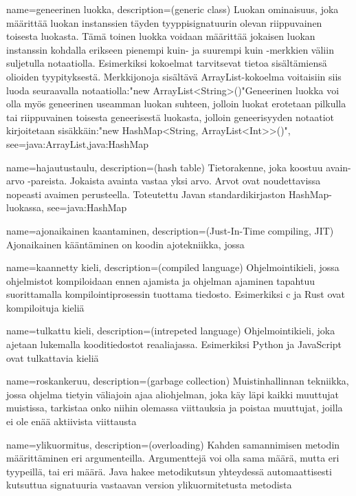 {
	name=geneerinen luokka,
	description={(generic class) Luokan ominaisuus, joka määrittää luokan instanssien täyden
tyyppisignatuurin olevan riippuvainen toisesta luokasta. Tämä toinen luokka voidaan määrittää
jokaisen luokan instanssin kohdalla erikseen pienempi kuin- ja suurempi kuin -merkkien väliin
suljetulla notaatiolla. Esimerkiksi kokoelmat tarvitsevat tietoa sisältämiensä olioiden
tyypityksestä. Merkkijonoja sisältävä ArrayList-kokoelma voitaisiin siis luoda seuraavalla 
notaatiolla:\newline{}"new ArrayList<String>()"\newline{}Geneerinen luokka voi olla myös geneerinen useamman luokan suhteen, jolloin luokat erotetaan pilkulla tai riippuvainen toisesta
geneerisestä luokasta, jolloin geneerisyyden notaatiot kirjoitetaan
sisäkkäin:\newline{}"new HashMap<String, ArrayList<Int>>()"},
	see={java:ArrayList,java:HashMap}
}

{
	name=hajautustaulu,
	description={(hash table) Tietorakenne, joka koostuu avain-arvo -pareista. Jokaista avainta
vastaa yksi arvo. Arvot ovat noudettavissa nopeasti avaimen perusteella. Toteutettu Javan
standardikirjaston HashMap-luokassa},
	see={java:HashMap}
}

{
	name=ajonaikainen kaantaminen,
	description={(Just-In-Time compiling, JIT) Ajonaikainen kääntäminen on koodin ajotekniikka,
jossa}
}


{
	name=kaannetty kieli,
	description={(compiled language) Ohjelmointikieli, jossa ohjelmistot kompiloidaan ennen
ajamista ja ohjelman ajaminen tapahtuu suorittamalla kompilointiprosessin tuottama tiedosto.
Esimerkiksi c ja Rust ovat kompiloituja kieliä}
}


{
	name=tulkattu kieli,
	description={(intrepeted language) Ohjelmointikieli, joka ajetaan lukemalla kooditiedostot
reaaliajassa. Esimerkiksi Python ja JavaScript ovat tulkattavia kieliä}
}

{
	name=roskankeruu,
	description={(garbage collection) Muistinhallinnan tekniikka, jossa ohjelma tietyin väliajoin
ajaa aliohjelman, joka käy läpi kaikki muuttujat muistissa, tarkistaa onko niihin olemassa
viittauksia ja poistaa muuttujat, joilla ei ole enää aktiivista viittausta}
}

{
	name=ylikuormitus,
	description={(overloading) Kahden samannimisen metodin määrittäminen eri argumenteilla.
Argumenttejä voi olla sama määrä, mutta eri tyypeillä, tai eri määrä. Java hakee metodikutsun
yhteydessä automaattisesti kutsuttua signatuuria vastaavan version ylikuormitetusta metodista}
}

